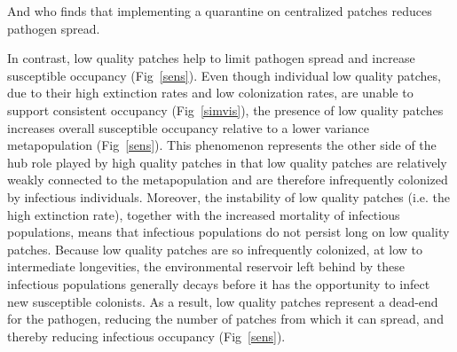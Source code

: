 \documentclass{svjour3}
\begin{document}
And \cite{Hess1996} who finds that implementing a quarantine on centralized patches reduces pathogen spread.

In contrast, low quality patches help to limit pathogen spread and increase susceptible occupancy (Fig~\ref{sens}). Even though individual low quality patches, due to their high extinction rates and low colonization rates, are unable to support consistent occupancy (Fig~\ref{simvis}), the presence of low quality patches increases overall susceptible occupancy relative to a lower variance metapopulation (Fig~\ref{sens}).  This phenomenon represents the other side of the hub role played by high quality patches in that low quality patches are relatively weakly connected to the metapopulation and are therefore infrequently colonized by infectious individuals.  Moreover, the instability of low quality patches (i.e. the high extinction rate), together with the increased mortality of infectious populations, means that infectious populations do not persist long on low quality patches.  Because low quality patches are so infrequently colonized, at low to intermediate longevities, the environmental reservoir left behind by these infectious populations generally decays before it has the opportunity to infect new susceptible colonists.  As a result, low quality patches represent a dead-end for the pathogen, reducing the number of patches from which it can spread, and thereby reducing infectious occupancy (Fig~\ref{sens}).  


%
\end{document}
